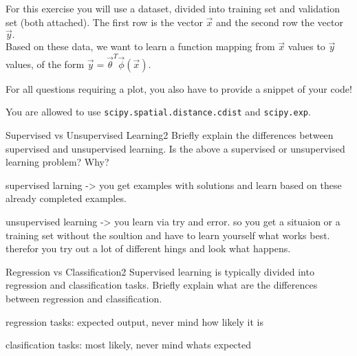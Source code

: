 For this exercise you will use a dataset, divided into training set and validation set (both attached). The first row is the vector $\vec x$ and the second row the vector $\vec y.$
\\
Based on these data, we want to learn a function mapping from $\vec x$ values to $\vec y$ values, of the form $\vec y=\vec{\theta}^{T}\vec{\phi}(\vec x)$.

For all questions requiring a plot, you also have to provide a snippet of your code!

You are allowed to use \texttt{scipy.spatial.distance.cdist} and \texttt{scipy.exp}.

\begin{questions}
	
	
	\begin{question}{Supervised vs Unsupervised Learning}{2}
		Briefly explain the differences between supervised and unsupervised learning. 
		Is the above a supervised or unsupervised learning problem? Why?

\begin{answer}
supervised larning -> you get examples with solutions and learn based on these already completed examples.

unsupervised learning -> you learn via try and error. so you get a situaion or a training set without the soultion and have to learn yourself what works best. therefor you try out a lot of different hings and look what happens.



\end{answer}
	\end{question}
	
	
	
	\begin{question}{Regression vs Classification}{2}
		Supervised learning is typically divided into regression and classification tasks. 
		Briefly explain what are the differences between regression and classification.
		
\begin{answer}
	regression tasks: expected output, never mind how likely it is
	
	clasification tasks: most likely, never mind whats expected
	
	

\end{answer}
\end{question}
\end{questions}
